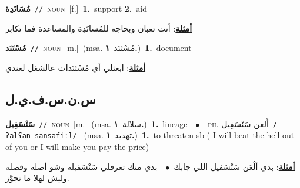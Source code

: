 \documentclass[10pt,a4paper,twoside]{article} %
\begin{document}
\begin{multicols}{2}
{\setlength\topsep{0pt}\textbf{\foreignlanguage{arabic}{مُسَانَدِة}}\ {\color{gray}\texttt{//}\color{black}}\ \textsc{noun}\ [f.]\ \textbf{1.}~support  \textbf{2.}~aid\  \begin{flushright}\color{gray}\foreignlanguage{arabic}{\textbf{\underline{\foreignlanguage{arabic}{أمثلة}}}: أنت تعبان وبحاجة للمُسانَدِة والمساعدة فما تكابر}\end{flushright}\color{black}} \vspace{2mm}

{\setlength\topsep{0pt}\textbf{\foreignlanguage{arabic}{مُسْتَنَد}}\ {\color{gray}\texttt{//}\color{black}}\ \textsc{noun}\ [m.]\ \color{gray}(msa. \foreignlanguage{arabic}{مُسْتَنَد}~\foreignlanguage{arabic}{\textbf{١.}})\color{black}\ \textbf{1.}~document\  \begin{flushright}\color{gray}\foreignlanguage{arabic}{\textbf{\underline{\foreignlanguage{arabic}{أمثلة}}}: ابعثلي أي مُسْتَنَدات عالشغل لعندي}\end{flushright}\color{black}} \vspace{2mm}

\vspace{-3mm}
\subsection*{\color{blue}\foreignlanguage{arabic}{س.ن.س.ف.ي.ل}\color{blue}{ (ntws)}} 

{\setlength\topsep{0pt}\textbf{\foreignlanguage{arabic}{سَنْسَفِيل}}\ {\color{gray}\texttt{//}\color{black}}\ \textsc{noun}\ [m.]\ \color{gray}(msa. \foreignlanguage{arabic}{سلالة}~\foreignlanguage{arabic}{\textbf{١.}})\color{black}\ \textbf{1.}~lineage\ \ $\bullet$\ \ \textsc{ph.} \color{gray} \foreignlanguage{arabic}{أَلعن سَنْسَفِيل}\color{black}\ {\color{gray}\texttt{/{\sffamily ʔalʕan sansafiːl}/}\color{black}}\ \color{gray} (msa. \foreignlanguage{arabic}{تهديد}~\foreignlanguage{arabic}{\textbf{١.}})\color{black}\ \textbf{1.}~to threaten sb ( I will beat the hell out of you or I will make you pay the price)\  \begin{flushright}\color{gray}\foreignlanguage{arabic}{\textbf{\underline{\foreignlanguage{arabic}{أمثلة}}}: بدي ألْعَن سَنْسَفيل اللي جابك\ $\bullet$\ \  بدي منك تعرفلي سَنْسَفيله وشو أصله وفصله وليش لهلا ما تجوَّز.}\end{flushright}\color{black}} \vspace{2mm}


\end{multicols}
\end{document}
